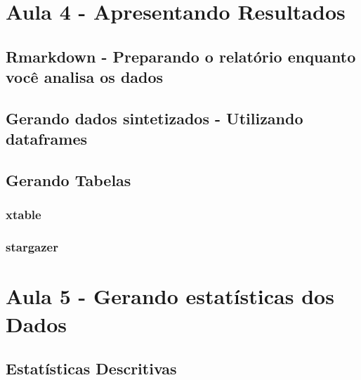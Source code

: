 \documentclass[12pt,a4paper,oneside]{erdc}
\begin{document}
%
%
%



\chapter{Aula 4 - Apresentando Resultados}

	\section{Rmarkdown - Preparando o relatório enquanto você analisa os dados}
	
	\section{Gerando dados sintetizados - Utilizando dataframes}
	
	\section{Gerando Tabelas}
	
		\subsection{xtable}
		
		\subsection{stargazer}




%
%


%
%
%


\chapter{Aula 5 - Gerando estatísticas dos Dados}

	\section{Estatísticas Descritivas}
	
\end{document}
